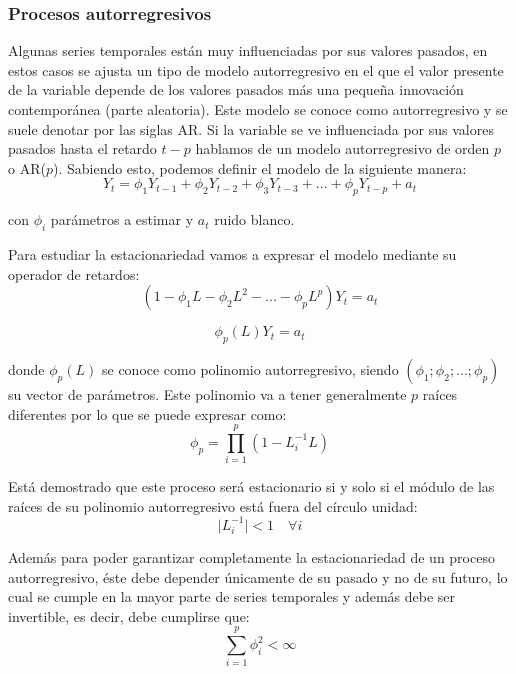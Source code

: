 \subsubsection{Procesos autorregresivos}
Algunas series temporales están muy influenciadas por sus valores pasados, en estos casos se ajusta un tipo de modelo autorregresivo en el que el valor presente de la variable depende de los valores pasados más una pequeña innovación contemporánea (parte aleatoria). Este modelo se conoce como autorregresivo y se suele denotar por las siglas AR. Si la variable se ve influenciada por sus valores pasados hasta el retardo $t-p$ hablamos de un modelo autorregresivo de orden $p$ o AR($p$). Sabiendo esto, podemos definir el modelo de la siguiente manera:
\begin{equation}
    Y_{t}=\phi_{1} Y_{t-1} + \phi_{2} Y_{t-2} + \phi_{3} Y_{t-3}+...+\phi_{p} Y_{t-p}+a_{t}
\end{equation}

\noindent con $\phi_i$ parámetros a estimar y $a_{t}$ ruido blanco.

Para estudiar la estacionariedad vamos a expresar el modelo mediante su operador de retardos:
\begin{equation}
    (1-\phi_{1}L-\phi_{2}L^{2}-...-\phi_{p}L^{p})Y_{t} = a_{t}
\end{equation}

\begin{equation}
    \phi_{p}(L)Y_{t} = a_{t}
\end{equation}

\noindent donde $\phi_{p}(L)$ se conoce como polinomio autorregresivo, siendo $(\phi_{1};\phi_{2};...;\phi_{p})$ su vector de parámetros. Este polinomio va a tener generalmente $p$ raíces diferentes por lo que se puede expresar como:
\begin{equation}
    \phi_{p} = \prod_{i=1}^{p}(1-L_{i}^{-1}L)
\end{equation}

Está demostrado que este proceso será estacionario si y solo si el módulo de las raíces de su polinomio autorregresivo está fuera del círculo unidad:
\begin{equation}
    \mid L_{i}^{-1}\mid < 1 \quad \forall{i}
\end{equation}

Además para poder garantizar completamente la estacionariedad de un proceso autorregresivo, éste debe depender  únicamente de su pasado y no de su futuro, lo cual se cumple en la mayor parte de series temporales y además debe ser invertible, es decir, debe cumplirse que:
\begin{equation}
    \sum_{i=1}^{p} \phi_{i}^{2} < \infty
\end{equation}

